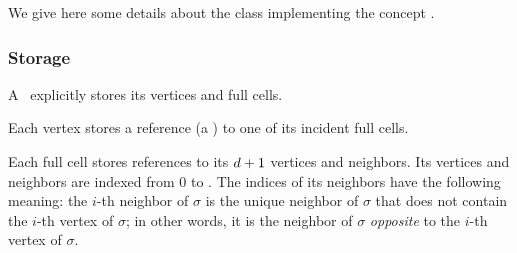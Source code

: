We give here some details about the class
implementing the concept .


\subsubsection{Storage}

A \tds\ explicitly stores its vertices and full cells.

Each vertex stores a reference (a ) to one of its incident
full cells.


Each full cell stores references to its $d+1$ vertices and
neighbors. Its vertices and neighbors are indexed from $0$ to \cd. The indices
of its neighbors have the following meaning: the $i$-th neighbor of $\sigma$
is the unique neighbor of $\sigma$ that does not contain the $i$-th vertex of
$\sigma$; in other words, it is the neighbor of $\sigma$ {\em opposite} to
the $i$-th vertex of $\sigma$.

